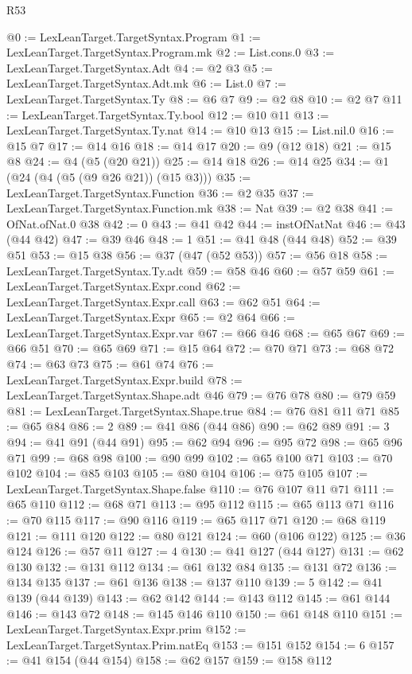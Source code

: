 \begin{lexlean}{R53}
\begin{coremodule}
@0 := LexLeanTarget.TargetSyntax.Program
@1 := LexLeanTarget.TargetSyntax.Program.mk
@2 := List.cons.{0}
@3 := LexLeanTarget.TargetSyntax.Adt
@4 := @2 @3
@5 := LexLeanTarget.TargetSyntax.Adt.mk
@6 := List.{0}
@7 := LexLeanTarget.TargetSyntax.Ty
@8 := @6 @7
@9 := @2 @8
@10 := @2 @7
@11 := LexLeanTarget.TargetSyntax.Ty.bool
@12 := @10 @11
@13 := LexLeanTarget.TargetSyntax.Ty.nat
@14 := @10 @13
@15 := List.nil.{0}
@16 := @15 @7
@17 := @14 @16
@18 := @14 @17
@20 := @9 (@12 @18)
@21 := @15 @8
@24 := @4 (@5 (@20 @21))
@25 := @14 @18
@26 := @14 @25
@34 := @1 (@24 (@4 (@5 (@9 @26 @21)) (@15 @3)))
@35 := LexLeanTarget.TargetSyntax.Function
@36 := @2 @35
@37 := LexLeanTarget.TargetSyntax.Function.mk
@38 := Nat
@39 := @2 @38
@41 := OfNat.ofNat.{0} @38
@42 := 0
@43 := @41 @42
@44 := instOfNatNat
@46 := @43 (@44 @42)
@47 := @39 @46
@48 := 1
@51 := @41 @48 (@44 @48)
@52 := @39 @51
@53 := @15 @38
@56 := @37 (@47 (@52 @53))
@57 := @56 @18
@58 := LexLeanTarget.TargetSyntax.Ty.adt
@59 := @58 @46
@60 := @57 @59
@61 := LexLeanTarget.TargetSyntax.Expr.cond
@62 := LexLeanTarget.TargetSyntax.Expr.call
@63 := @62 @51
@64 := LexLeanTarget.TargetSyntax.Expr
@65 := @2 @64
@66 := LexLeanTarget.TargetSyntax.Expr.var
@67 := @66 @46
@68 := @65 @67
@69 := @66 @51
@70 := @65 @69
@71 := @15 @64
@72 := @70 @71
@73 := @68 @72
@74 := @63 @73
@75 := @61 @74
@76 := LexLeanTarget.TargetSyntax.Expr.build
@78 := LexLeanTarget.TargetSyntax.Shape.adt @46
@79 := @76 @78
@80 := @79 @59
@81 := LexLeanTarget.TargetSyntax.Shape.true
@84 := @76 @81 @11 @71
@85 := @65 @84
@86 := 2
@89 := @41 @86 (@44 @86)
@90 := @62 @89
@91 := 3
@94 := @41 @91 (@44 @91)
@95 := @62 @94
@96 := @95 @72
@98 := @65 @96 @71
@99 := @68 @98
@100 := @90 @99
@102 := @65 @100 @71
@103 := @70 @102
@104 := @85 @103
@105 := @80 @104
@106 := @75 @105
@107 := LexLeanTarget.TargetSyntax.Shape.false
@110 := @76 @107 @11 @71
@111 := @65 @110
@112 := @68 @71
@113 := @95 @112
@115 := @65 @113 @71
@116 := @70 @115
@117 := @90 @116
@119 := @65 @117 @71
@120 := @68 @119
@121 := @111 @120
@122 := @80 @121
@124 := @60 (@106 @122)
@125 := @36 @124
@126 := @57 @11
@127 := 4
@130 := @41 @127 (@44 @127)
@131 := @62 @130
@132 := @131 @112
@134 := @61 @132 @84
@135 := @131 @72
@136 := @134 @135
@137 := @61 @136
@138 := @137 @110
@139 := 5
@142 := @41 @139 (@44 @139)
@143 := @62 @142
@144 := @143 @112
@145 := @61 @144
@146 := @143 @72
@148 := @145 @146 @110
@150 := @61 @148 @110
@151 := LexLeanTarget.TargetSyntax.Expr.prim
@152 := LexLeanTarget.TargetSyntax.Prim.natEq
@153 := @151 @152
@154 := 6
@157 := @41 @154 (@44 @154)
@158 := @62 @157
@159 := @158 @112

\end{coremodule}
\end{lexlean}
